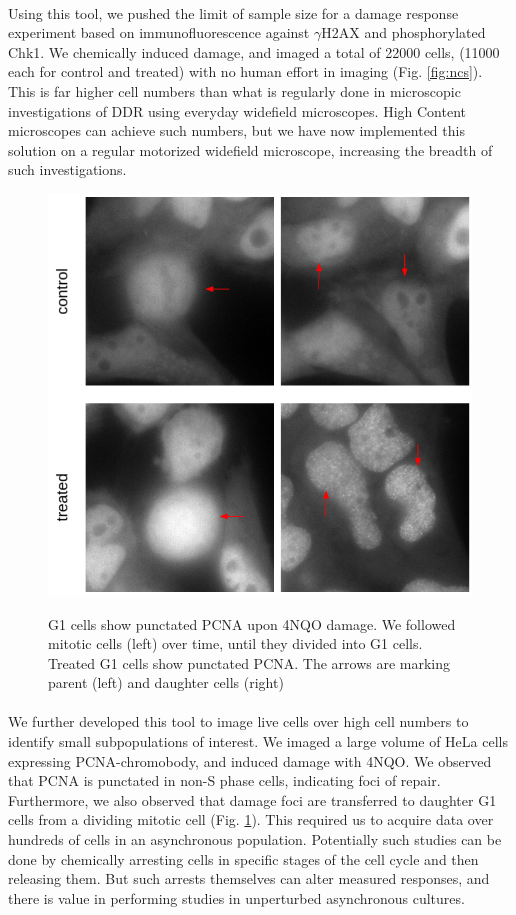 \paragraph*{} Using this tool, we pushed the limit of sample size for a damage response experiment based on immunofluorescence against $\gamma$H2AX and phosphorylated Chk1. We chemically induced damage, and imaged a total of 22000 cells, (11000 each for control and treated) with no human effort in imaging (Fig. \ref{fig:ncs}). This is far higher cell numbers than what is regularly done in microscopic investigations of DDR using everyday widefield microscopes. High Content microscopes can achieve such numbers, but we have now implemented this solution on a regular motorized widefield microscope, increasing the breadth of such investigations.

\begin{figure}[H]
    {\hfill\includegraphics[clip, width=0.8\linewidth]{figures/g1.png}\hspace*{\fill}}
    \caption{G1 cells show punctated PCNA upon 4NQO damage. We followed mitotic cells (left) over time, until they divided into G1 cells. Treated G1 cells show punctated PCNA. The arrows are marking parent (left) and daughter cells (right)}
    {\label{fig:g1}}
\end{figure}

\paragraph*{} We further developed this tool to image live cells over high cell numbers to identify small subpopulations of interest. We imaged a large volume of HeLa cells expressing PCNA-chromobody, and induced damage with 4NQO. We observed that PCNA is punctated in non-S phase cells, indicating foci of repair. Furthermore, we also observed that damage foci are transferred to daughter G1 cells from a dividing mitotic cell (Fig. \ref{fig:g1}). This required us to acquire data over hundreds of cells in an asynchronous population. Potentially such studies can be done by chemically arresting cells in specific stages of the cell cycle and then releasing them. But such arrests themselves can alter measured responses, and there is value in performing studies in unperturbed asynchronous cultures.

